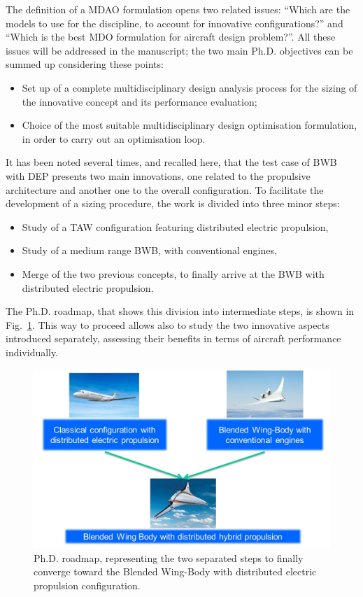 The definition of a MDAO formulation opens two related issues: ``Which are the models to use for the discipline, to account for innovative configurations?'' and ``Which is the best MDO formulation for aircraft design problem?''.
All these issues will be addressed in the manuscript; the two main Ph.D. objectives can be summed up considering these points: 
\begin{itemize}
	
	\item Set up of a complete multidisciplinary design analysis process for the sizing of the innovative concept and its performance evaluation;
	
	\item Choice of the most suitable multidisciplinary design optimisation formulation, in order to carry out an optimisation loop.
\end{itemize} 

It has been noted several times, and recalled here, that the test case of BWB with DEP presents two main innovations, one related to the propulsive architecture and another one to the overall configuration. 
To facilitate the development of a sizing procedure, the work is divided into three minor steps:
\begin{itemize}
	\item Study of a TAW configuration featuring distributed electric propulsion,
	\item Study of a medium range BWB, with conventional engines,
	\item Merge of the two previous concepts, to finally arrive at the BWB with distributed electric propulsion.
\end{itemize}

The Ph.D. roadmap, that shows this division into intermediate steps, is shown in Fig.~\ref{fig:phd_roadmap}.
This way to proceed allows also to study the two innovative aspects introduced separately, assessing their benefits in terms of aircraft performance individually. 
\begin{figure}[!h]
	\centering
	\includegraphics[keepaspectratio, width=\textwidth]{images/chap1/phd_roadmap.jpg}
	\caption{Ph.D. roadmap, representing the two separated steps to finally converge toward the Blended Wing-Body with distributed electric propulsion configuration.}
	\label{fig:phd_roadmap}
\end{figure}

